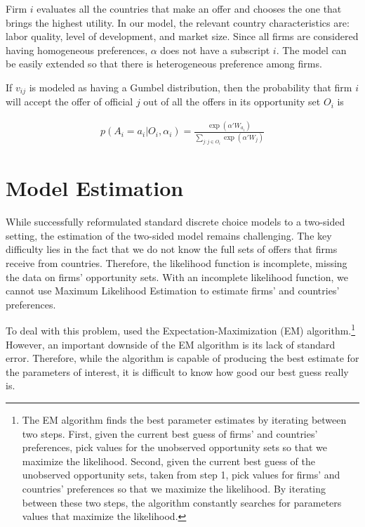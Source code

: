 Firm $i$ evaluates all the countries that make an offer and chooses the one that brings the highest utility. In our model, the relevant country characteristics are: labor quality, level of development, and market size. Since all firms are considered having homogeneous preferences, $\alpha$ does not have a subscript $i$. The model can be easily extended so that there is heterogeneous preference among firms.

If $v_{ij}$ is modeled as having a Gumbel distribution, then the probability that firm $i$ will accept the offer of official $j$ out of all the offers in its opportunity set $O_i$ is

\begin{align}
p(A_i = a_i | O_i, \alpha_i) = \frac{\exp(\alpha'W_{a_i})}{\sum\limits_{j:j \in O_i} \exp(\alpha'W_j)} \label{eq:conditional_probability_of_accept}
\end{align}

\section{Model Estimation}
\label{sec:tsl_estimate}

While \citet{Logan1996, Logan1998} successfully reformulated standard discrete choice models to a two-sided setting, the estimation of the two-sided model remains challenging. The key difficulty lies in the fact that we do not know the full sets of offers that firms receive from countries. Therefore, the likelihood function is incomplete, missing the data on firms' opportunity sets. With an incomplete likelihood function, we cannot use Maximum Likelihood Estimation to estimate firms' and countries' preferences.

To deal with this problem, \cite{Logan1996} used the Expectation-Maximization (EM) algorithm.\footnote{The EM algorithm finds the best parameter estimates by iterating between two steps. First, given the current best guess of firms' and countries' preferences, pick values for the unobserved opportunity sets so that we maximize the likelihood. Second, given the current best guess of the unobserved opportunity sets, taken from step 1, pick values for firms' and countries' preferences so that we maximize the likelihood. By iterating between these two steps, the algorithm constantly searches for parameters values that maximize the likelihood.} However, an important downside of the EM algorithm is its lack of standard error. Therefore, while the algorithm is capable of producing the best estimate for the parameters of interest, it is difficult to know how good our best guess really is.

